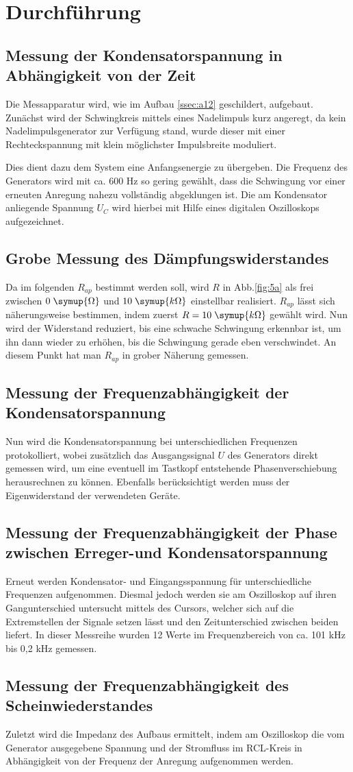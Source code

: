 \section{Durchführung}
\label{sec:Durchführung}


\subsection{Messung der Kondensatorspannung in Abhängigkeit von der Zeit}
Die Messapparatur wird, wie im Aufbau \ref{ssec:a12} geschildert, aufgebaut.
Zunächst wird der Schwingkreis mittels eines Nadelimpuls kurz angeregt,
da kein Nadelimpulsgenerator zur Verfügung stand, wurde dieser mit einer
Rechteckspannung mit klein möglichster Impulsbreite moduliert.

Dies dient dazu dem System eine Anfangsenergie zu übergeben. Die Frequenz des
Generators wird mit ca. 600 Hz so gering gewählt, dass die Schwingung vor einer
erneuten Anregung nahezu vollständig abgeklungen ist. Die am Kondensator
anliegende Spannung $U_C$ wird hierbei mit Hilfe eines digitalen Oszilloskops
aufgezeichnet.



\subsection{Grobe Messung des Dämpfungswiderstandes}
Da im folgenden $R_{ap}$ bestimmt werden soll, wird $R$ in Abb.\ref{fig:5a} als
frei zwischen $0\;\symup{\Omega}$ und $10\;\symup{k\Omega}$ einstellbar realisiert.
$R_{ap}$ lässt
sich näherungsweise bestimmen, indem zuerst $R = 10\;\symup{k\Omega}$ gewählt wird. Nun
wird der Widerstand reduziert, bis eine schwache Schwingung
erkennbar ist, um ihn dann wieder zu erhöhen, bis die Schwingung
gerade eben verschwindet. An diesem Punkt hat man $R_{ap}$ in grober Näherung
gemessen.

\subsection{Messung der Frequenzabhängigkeit der Kondensatorspannung}
Nun wird die
Kondensatorspannung bei unterschiedlichen Frequenzen protokolliert, wobei
zusätzlich das Ausgangssignal $U$ des Generators direkt gemessen wird, um eine
eventuell im Tastkopf entstehende Phasenverschiebung herausrechnen zu können.
Ebenfalls berücksichtigt werden muss der Eigenwiderstand der verwendeten Geräte.

\subsection{Messung der Frequenzabhängigkeit der Phase zwischen Erreger-und Kondensatorspannung}
Erneut werden Kondensator- und Eingangsspannung für unterschiedliche Frequenzen
aufgenommen. Diesmal jedoch werden sie am Oszilloskop auf ihren Gangunterschied
untersucht mittels des Cursors, welcher sich auf die Extremstellen der Signale
setzen lässt und den Zeitunterschied zwischen beiden liefert.
In dieser Messreihe wurden 12 Werte im Frequenzbereich von ca. 101 kHz bis 0,2 kHz
gemessen.


\subsection{Messung der Frequenzabhängigkeit des Scheinwiederstandes}
Zuletzt wird die Impedanz des Aufbaus ermittelt, indem am Oszilloskop die vom
Generator ausgegebene Spannung und der Stromfluss im RCL-Kreis in Abhängigkeit
von der Frequenz der Anregung aufgenommen werden.
